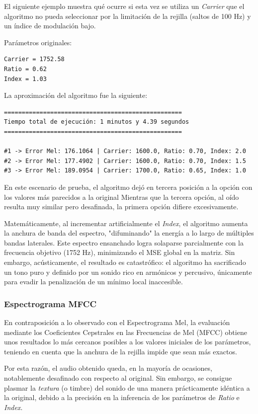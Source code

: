\documentclass[12pt, a4paper]{article}
\begin{document}
El siguiente ejemplo muestra qué ocurre si esta vez se utiliza un \textit{Carrier} que el algoritmo no pueda seleccionar por la
limitación de la rejilla (saltos de 100 Hz) y un índice de modulación bajo.

Parámetros originales:
\begin{verbatim}
Carrier = 1752.58
Ratio = 0.62
Index = 1.03
\end{verbatim}

La aproximación del algoritmo fue la siguiente:

\begin{verbatim}
==================================================
Tiempo total de ejecución: 1 minutos y 4.39 segundos
==================================================

#1 -> Error Mel: 176.1064 | Carrier: 1600.0, Ratio: 0.70, Index: 2.0
#2 -> Error Mel: 177.4902 | Carrier: 1600.0, Ratio: 0.70, Index: 1.5
#3 -> Error Mel: 189.0954 | Carrier: 1700.0, Ratio: 0.65, Index: 1.0
\end{verbatim}

En este escenario de prueba, el algoritmo dejó en tercera posición a la opción con los valores más parecidos a la original
Mientras que la tercera opción, al oído resulta muy similar pero desafinada, la primera opción difiere excesivamente.
 
Matemáticamente, al incrementar artificialmente el \textit{Index}, el algoritmo aumenta la anchura de banda del espectro, 
"difuminando" la energía a lo largo de múltiples bandas laterales. Este espectro ensanchado logra solaparse parcialmente 
con la frecuencia objetivo (1752 Hz), minimizando el MSE global en la matriz. Sin embargo, acústicamente, el resultado es 
catastrófico: el algoritmo ha sacrificado un tono puro y definido por un sonido rico en armónicos y percusivo, únicamente 
para evadir la penalización de un mínimo local inaccesible.

\subsubsection{Espectrograma MFCC}
En contraposición a lo observado con el Espectrograma Mel, la evaluación mediante los Coeficientes Cepstrales en las Frecuencias de Mel (MFCC)
obtiene unos resultados lo más cercanos posibles
a los valores iniciales de los parámetros, teniendo en cuenta que la anchura de la rejilla impide
que sean más exactos. 

Por esta razón, el audio obtenido queda, en la mayoría de ocasiones,
notablemente desafinado con respecto al original. Sin embargo, se consigue plasmar la \textit{textura} (o timbre)
del sonido de una manera prácticamente idéntica a la original, debido a la precisión en la inferencia
de los parámetros de \textit{Ratio} e \textit{Index}.
\end{document}
